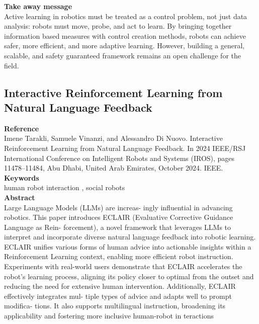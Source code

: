 \documentclass[report.tex]{subfiles}
\begin{document}
\noindent\textbf{Take away message}  \\
Active learning in robotics must be treated as a control problem, not just data analysis: robots must move, probe, and act to learn. By bringing together information based measures with control creation methods, robots can achieve safer, more efficient, and more adaptive learning. However, building a general, scalable, and safety guaranteed framework remains an open challenge for the field.

















\subsection{Interactive Reinforcement Learning from Natural Language Feedback} 

\noindent\textbf{Reference} \\
\cite{tarakli_interactive_2024}Imene Tarakli, Samuele Vinanzi, and Alessandro Di Nuovo. Interactive Reinforcement Learning from
Natural Language Feedback. In 2024 IEEE/RSJ International Conference on Intelligent Robots and
Systems (IROS), pages 11478–11484, Abu Dhabi, United Arab Emirates, October 2024. IEEE.
\\


\noindent\textbf{Keywords} \\
human robot interaction , social robots 
   \\

\noindent\textbf{Abstract} \\
Large Language Models (LLMs) are increas-
ingly influential in advancing robotics. This paper introduces
ECLAIR (Evaluative Corrective Guidance Language as Rein-
forcement), a novel framework that leverages LLMs to interpret
and incorporate diverse natural language feedback into robotic
learning. ECLAIR unifies various forms of human advice into
actionable insights within a Reinforcement Learning context,
enabling more efficient robot instruction. Experiments with
real-world users demonstrate that ECLAIR accelerates the
robot’s learning process, aligning its policy closer to optimal
from the outset and reducing the need for extensive human
intervention. Additionally, ECLAIR effectively integrates mul-
tiple types of advice and adapts well to prompt modifica-
tions. It also supports multilingual instruction, broadening
its applicability and fostering more inclusive human-robot in 
teractions\\
\end{document}
